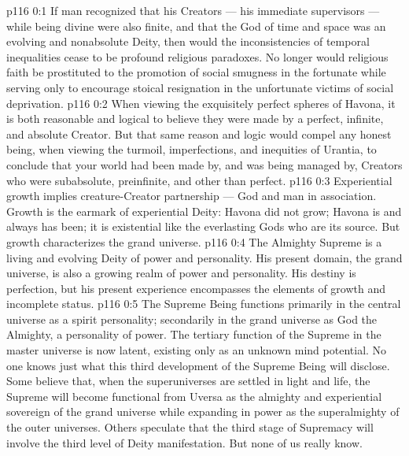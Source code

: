\author{Mighty Messenger}
\vs p116 0:1 If man recognized that his Creators --- his immediate supervisors --- while being divine were also finite, and that the God of time and space was an evolving and nonabsolute Deity, then would the inconsistencies of temporal inequalities cease to be profound religious paradoxes. No longer would religious faith be prostituted to the promotion of social smugness in the fortunate while serving only to encourage stoical resignation in the unfortunate victims of social deprivation.
\vs p116 0:2 When viewing the exquisitely perfect spheres of Havona, it is both reasonable and logical to believe they were made by a perfect, infinite, and absolute Creator. But that same reason and logic would compel any honest being, when viewing the turmoil, imperfections, and inequities of Urantia, to conclude that your world had been made by, and was being managed by, Creators who were subabsolute, preinfinite, and other than perfect.
\vs p116 0:3 \pc Experiential growth implies creature\hyp{}Creator partnership --- God and man in association. Growth is the earmark of experiential Deity: Havona did not grow; Havona is and always has been; it is existential like the everlasting Gods who are its source. But growth characterizes the grand universe.
\vs p116 0:4 The Almighty Supreme is a living and evolving Deity of power and personality. His present domain, the grand universe, is also a growing realm of power and personality. His destiny is perfection, but his present experience encompasses the elements of growth and incomplete status.
\vs p116 0:5 \pc The Supreme Being functions primarily in the central universe as a spirit personality; secondarily in the grand universe as God the Almighty, a personality of power. The tertiary function of the Supreme in the master universe is now latent, existing only as an unknown mind potential. No one knows just what this third development of the Supreme Being will disclose. Some believe that, when the superuniverses are settled in light and life, the Supreme will become functional from Uversa as the almighty and experiential sovereign of the grand universe while expanding in power as the superalmighty of the outer universes. Others speculate that the third stage of Supremacy will involve the third level of Deity manifestation. But none of us really know.
